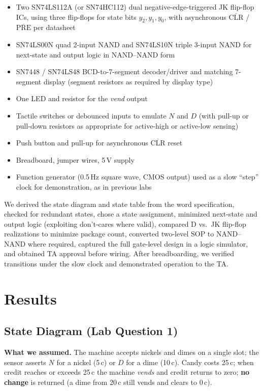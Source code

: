 \documentclass[12pt, letterpaper]{article}
\begin{document}
\begin{itemize}
  \item Two SN74LS112A (or SN74HC112) dual negative-edge-triggered JK flip-flop ICs, using three
        flip-flops for state bits $y_2,y_1,y_0$, with asynchronous $\overline{\text{CLR}}$ /
        $\overline{\text{PRE}}$ per datasheet
  \item SN74LS00N quad 2-input NAND and SN74LS10N triple 3-input NAND for next-state and
        output logic in NAND--NAND form
  \item SN7448 / SN74LS48 BCD-to-7-segment decoder/driver and matching 7-segment display
        (segment resistors as required by display type)
  \item One LED and resistor for the \textit{vend} output
  \item Tactile switches or debounced inputs to emulate $N$ and $D$ (with pull-up or pull-down
        resistors as appropriate for active-high or active-low sensing)
  \item Push button and pull-up for asynchronous $\overline{\text{CLR}}$ reset
  \item Breadboard, jumper wires, 5\,V supply
  \item Function generator (0.5\,Hz square wave, CMOS output) used as a slow ``step'' clock for
        demonstration, as in previous labs
\end{itemize}

We derived the state diagram and state table from the word specification, checked for
redundant states, chose a state assignment, minimized next-state and output logic (exploiting
don't-cares where valid), compared D vs.\ JK flip-flop realizations to minimize package count,
converted two-level SOP to NAND--NAND where required, captured the full gate-level design in a
logic simulator, and obtained TA approval before wiring.  After breadboarding, we verified transitions
under the slow clock and demonstrated operation to the TA.

\section{Results}

\subsection{State Diagram (Lab Question 1)}

\textbf{What we assumed.}  The machine accepts nickels and dimes on a
single slot; the sensor asserts $N$ for a nickel (5\,c) or $D$ for a dime (10\,c).  Candy
costs 25\,c; when credit reaches or exceeds 25\,c the machine \textit{vends} and credit
returns to zero; \textbf{no change} is returned (a dime from 20\,c still vends and clears to
0\,c).
\end{document}
